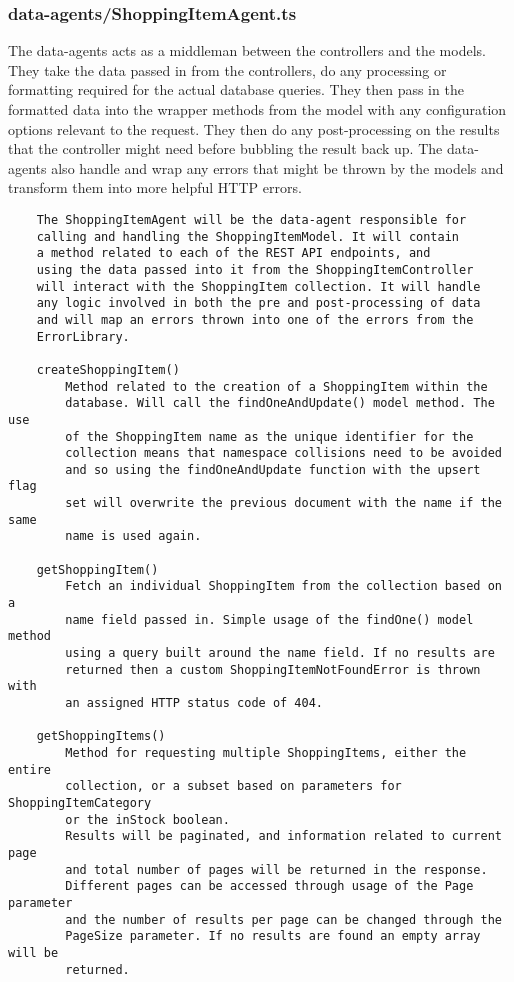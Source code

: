\subsubsection{data-agents/ShoppingItemAgent.ts}
The data-agents acts as a middleman between the controllers and the models. They take the data passed in from the controllers, do any processing or formatting required for the actual database queries. They then pass in the formatted data into the wrapper methods from the model with any configuration options relevant to the request. They then do any post-processing on the results that the controller might need before bubbling the result back up. The data-agents also handle and wrap any errors that might be thrown by the models and transform them into more helpful HTTP errors.
\begin{verbatim}
    The ShoppingItemAgent will be the data-agent responsible for 
    calling and handling the ShoppingItemModel. It will contain 
    a method related to each of the REST API endpoints, and 
    using the data passed into it from the ShoppingItemController
    will interact with the ShoppingItem collection. It will handle
    any logic involved in both the pre and post-processing of data
    and will map an errors thrown into one of the errors from the 
    ErrorLibrary.
    
    createShoppingItem()
        Method related to the creation of a ShoppingItem within the
        database. Will call the findOneAndUpdate() model method. The use
        of the ShoppingItem name as the unique identifier for the
        collection means that namespace collisions need to be avoided
        and so using the findOneAndUpdate function with the upsert flag
        set will overwrite the previous document with the name if the same
        name is used again.
    
    getShoppingItem()
        Fetch an individual ShoppingItem from the collection based on a
        name field passed in. Simple usage of the findOne() model method
        using a query built around the name field. If no results are 
        returned then a custom ShoppingItemNotFoundError is thrown with 
        an assigned HTTP status code of 404.
    
    getShoppingItems()
        Method for requesting multiple ShoppingItems, either the entire
        collection, or a subset based on parameters for ShoppingItemCategory
        or the inStock boolean.
        Results will be paginated, and information related to current page
        and total number of pages will be returned in the response.
        Different pages can be accessed through usage of the Page parameter 
        and the number of results per page can be changed through the 
        PageSize parameter. If no results are found an empty array will be
        returned. 
    

\end{verbatim}
